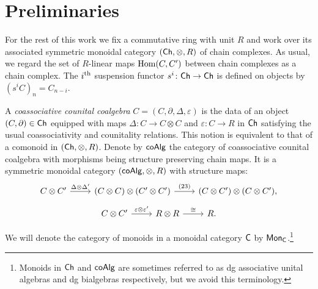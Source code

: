 
\section{Preliminaries}

For the rest of this work we fix a commutative ring with unit $R$ and work over its associated symmetric monoidal category $(\mathsf{Ch}, \otimes, R)$ of chain complexes.
As usual, we regard the set of $R$-linear maps $\mathrm{Hom}(C, C^\prime)$ between chain complexes as a chain complex.
The $i^\mathrm{th}$ suspension functor $s^i \colon \mathsf{Ch} \to \mathsf{Ch}$ is defined on objects by $(s^{i}C)_n= C_{n-i}$.

A \textit{coassociative counital coalgebra} $C = (C, \partial, \Delta, \varepsilon)$ is the data of an object $(C, \partial) \in \mathsf{Ch}$ equipped with maps $\Delta \colon C \to C \otimes C$ and $\varepsilon \colon C\to R$ in $\mathsf{Ch}$ satisfying the usual coassociativity and counitality relations. 
This notion is equivalent to that of a comonoid in $(\mathsf{Ch}, \otimes, R)$. Denote by $\mathsf{coAlg}$ the category of coassociative counital coalgebra with morphisms being structure preserving chain maps. 
It is a symmetric monoidal category $(\mathsf{coAlg}, \otimes, R)$ with structure maps:
 \begin{equation} \label{e:coalgebras are symmetric monoidal1}
\begin{tikzcd}
C \otimes C^\prime \arrow[r, "\Delta \otimes \Delta^\prime"] &
(C \otimes C) \otimes (C^\prime \otimes C^\prime) \arrow[r, "(23)"] &
(C \otimes C^\prime) \otimes (C \otimes C^\prime),
\end{tikzcd}
\end{equation}
\begin{equation} \label{e:coalgebras are symmetric monoidal2}
\begin{tikzcd}
C \otimes C^\prime \arrow[r, "\varepsilon \otimes \varepsilon^\prime"] &
R \otimes R \arrow[r, "\cong"] & R.
\end{tikzcd}
\end{equation}

We will denote the category of monoids in a monoidal category $\mathsf{C}$ by $\mathsf{Mon}_{\mathsf{C}}$.\footnote{Monoids in $\mathsf{Ch}$ and $\mathsf{coAlg}$ are sometimes referred to as dg associative unital algebras and dg bialgebras respectively, but we avoid this terminology.}




